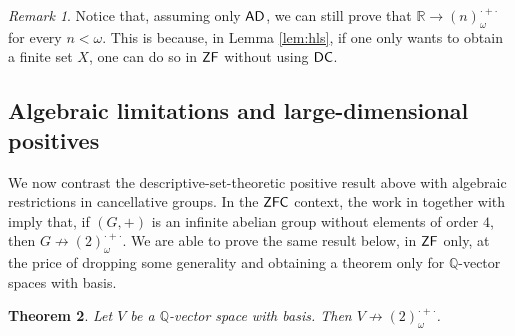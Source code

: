 \documentclass{amsart}
\newtheorem{theorem}{Theorem}[section]
\theoremstyle{definition}
\newcommand{\zf}{\mathnormal{\mathsf{ZF}}}
\newcommand{\dc}{\mathnormal{\mathsf{DC}}}
\newcommand{\ad}{\mathnormal{\mathsf{AD}}}
\newcommand{\zfc}{\mathnormal{\mathsf{ZFC}}}
\theoremstyle{remark}
\newtheorem{remark}[theorem]{Remark}
\numberwithin{equation}{section}
\begin{document}
\begin{remark}\label{rem:R-finite}
Notice that, assuming only $\ad$, we can still prove that $\mathbb{R}\to(n)^{\cdot+\cdot}_{\omega}$ for every $n<\omega$. This is because, in Lemma \ref{lem:hls}, if one only wants to obtain a finite set $X$, one can do so in $\zf$ without using $\dc$.
\end{remark}

\subsection{Algebraic limitations and large-dimensional positives}\label{subsec:owings-algebra}

We now contrast the descriptive-set-theoretic positive result above with algebraic restrictions in cancellative groups. In the $\zfc$ context, the work in \cite[Theorem 6]{FernandezSarmientoVera2024} together with \cite{LeaderWilliams2024} imply that, if $(G,+)$ is an infinite abelian group without elements of order $4$, then $G\not\to(2)^{\cdot+\cdot}_{\omega}$. We are able to prove the same result below, in $\zf$ only, at the price of dropping some generality and obtaining a theorem only for $\mathbb Q$-vector spaces with basis.

\begin{theorem}\label{thm:owings-Q-negative}
Let $V$ be a $\mathbb{Q}$-vector space with basis. 
Then $V\not\to(2)^{\cdot+\cdot}_{\omega}$.
\end{theorem}
\end{document}
